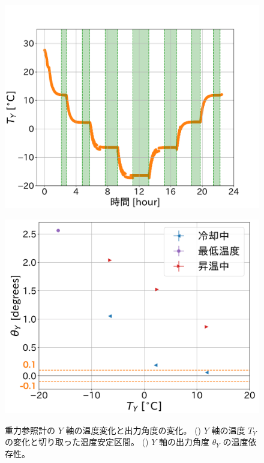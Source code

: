 \documentclass[../../main.tex]{subfiles}
\begin{document}
\begin{figure}[H]
    \begin{minipage}[b]{0.45\columnwidth}
        \centering
        \includegraphics[width=1.1\columnwidth]{tiltsensor/bath_tempY.pdf}
        \subcaption{}
        \label{fig:bath_tempY}
    \end{minipage}
    \hspace{0.005\columnwidth}
    \begin{minipage}[b]{0.45\columnwidth}
        \centering
        \includegraphics[width=1.03\columnwidth]{tiltsensor/angleY_temp_dep.pdf}
        \subcaption{}
        \label{fig:angleY_temp_dep}
    \end{minipage}
    \caption{重力参照計の $Y$ 軸の温度変化と出力角度の変化。
             () $Y$ 軸の温度 $T_{Y}$ の変化と切り取った温度安定区間。
             () $Y$ 軸の出力角度 $\theta_{Y}$ の温度依存性。}
    \label{fig:evaluation_bath_Yaxis}
\end{figure}
\end{document}
